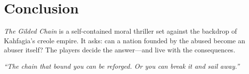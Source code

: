 \documentclass[11pt]{article}
\begin{document}
\section{Conclusion}

\textit{The Gilded Chain} is a self-contained moral thriller set against the backdrop of Kahfagia's creole empire. It asks: can a nation founded by the abused become an abuser itself? The players decide the answer---and live with the consequences.

\vspace{2\baselineskip}
\begin{center}
\textit{``The chain that bound you can be reforged. Or you can break it and sail away.''}
\end{center}
\end{document}
